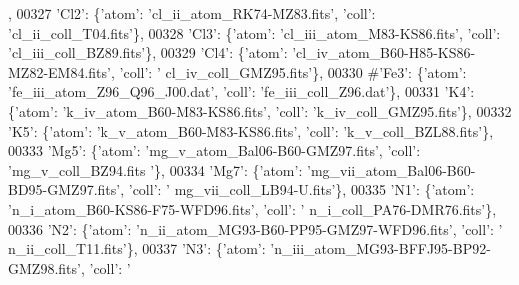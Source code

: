 \begin{DoxyCode}
      ,
00327                              \textcolor{stringliteral}{'Cl2'}: \{\textcolor{stringliteral}{'atom'}: \textcolor{stringliteral}{'cl\_ii\_atom\_RK74-MZ83.fits'}, \textcolor{stringliteral}{'coll'}: \textcolor{stringliteral}{'cl\_ii\_coll\_T04.fits'}\},
00328                              \textcolor{stringliteral}{'Cl3'}: \{\textcolor{stringliteral}{'atom'}: \textcolor{stringliteral}{'cl\_iii\_atom\_M83-KS86.fits'}, \textcolor{stringliteral}{'coll'}: \textcolor{stringliteral}{'cl\_iii\_coll\_BZ89.fits'}\},
00329                              \textcolor{stringliteral}{'Cl4'}: \{\textcolor{stringliteral}{'atom'}: \textcolor{stringliteral}{'cl\_iv\_atom\_B60-H85-KS86-MZ82-EM84.fits'}, \textcolor{stringliteral}{'coll'}: \textcolor{stringliteral}{'
      cl\_iv\_coll\_GMZ95.fits'}\},
00330                              \textcolor{comment}{#'Fe3': \{'atom': 'fe\_iii\_atom\_Z96\_Q96\_J00.dat', 'coll':
       'fe\_iii\_coll\_Z96.dat'\},}
00331                              \textcolor{stringliteral}{'K4'}: \{\textcolor{stringliteral}{'atom'}: \textcolor{stringliteral}{'k\_iv\_atom\_B60-M83-KS86.fits'}, \textcolor{stringliteral}{'coll'}: \textcolor{stringliteral}{'k\_iv\_coll\_GMZ95.fits'}\},
00332                              \textcolor{stringliteral}{'K5'}: \{\textcolor{stringliteral}{'atom'}: \textcolor{stringliteral}{'k\_v\_atom\_B60-M83-KS86.fits'}, \textcolor{stringliteral}{'coll'}: \textcolor{stringliteral}{'k\_v\_coll\_BZL88.fits'}\},
00333                              \textcolor{stringliteral}{'Mg5'}: \{\textcolor{stringliteral}{'atom'}: \textcolor{stringliteral}{'mg\_v\_atom\_Bal06-B60-GMZ97.fits'}, \textcolor{stringliteral}{'coll'}: \textcolor{stringliteral}{'mg\_v\_coll\_BZ94.fits
      '}\},
00334                              \textcolor{stringliteral}{'Mg7'}: \{\textcolor{stringliteral}{'atom'}: \textcolor{stringliteral}{'mg\_vii\_atom\_Bal06-B60-BD95-GMZ97.fits'}, \textcolor{stringliteral}{'coll'}: \textcolor{stringliteral}{'
      mg\_vii\_coll\_LB94-U.fits'}\},
00335                              \textcolor{stringliteral}{'N1'}: \{\textcolor{stringliteral}{'atom'}: \textcolor{stringliteral}{'n\_i\_atom\_B60-KS86-F75-WFD96.fits'}, \textcolor{stringliteral}{'coll'}: \textcolor{stringliteral}{'
      n\_i\_coll\_PA76-DMR76.fits'}\},
00336                              \textcolor{stringliteral}{'N2'}: \{\textcolor{stringliteral}{'atom'}: \textcolor{stringliteral}{'n\_ii\_atom\_MG93-B60-PP95-GMZ97-WFD96.fits'}, \textcolor{stringliteral}{'coll'}: \textcolor{stringliteral}{'
      n\_ii\_coll\_T11.fits'}\},
00337                              \textcolor{stringliteral}{'N3'}: \{\textcolor{stringliteral}{'atom'}: \textcolor{stringliteral}{'n\_iii\_atom\_MG93-BFFJ95-BP92-GMZ98.fits'}, \textcolor{stringliteral}{'coll'}: \textcolor{stringliteral}{'
}
\end{DoxyCode}
